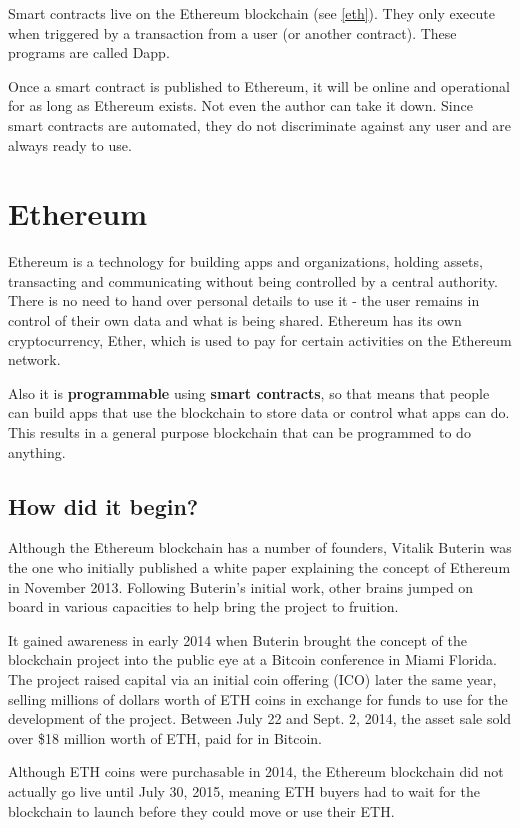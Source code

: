 \documentclass[MSE,Master,english]{twbook}%
\begin{document}
Smart contracts live on the Ethereum blockchain  (see \ref{eth}). They only execute when triggered by a transaction from a user (or another contract). These programs are called \ac{Dapp}.

Once a smart contract is published to Ethereum, it will be online and operational for as long as Ethereum exists. Not even the author can take it down. Since smart contracts are automated, they do not discriminate against any user and are always ready to use.\cite{ethereum}

\section{Ethereum\label{eth}}
Ethereum is a technology for building apps and organizations, holding assets, transacting and communicating without being controlled by a central authority. There is no need to hand over personal details to use it - the user remains in control of their own data and what is being shared. Ethereum has its own cryptocurrency, Ether, which is used to pay for certain activities on the Ethereum network.

Also it is \textbf{programmable} using \textbf{smart contracts}, so that means that people can build apps that use the blockchain to store data or control what apps can do. This results in a general purpose blockchain that can be programmed to do anything.\cite{ethereum}

\subsection{How did it begin?}
Although the Ethereum blockchain has a number of founders, Vitalik Buterin\cite{ethHistory} was the one who initially published a white paper explaining the concept of Ethereum in November 2013. Following Buterin's initial work, other brains jumped on board in various capacities to help bring the project to fruition.

It gained awareness in early 2014 when Buterin brought the concept of the blockchain project into the public eye at a Bitcoin conference in Miami Florida. The project raised capital via an initial coin offering (ICO) later the same year, selling millions of dollars worth of ETH coins in exchange for funds to use for the development of the project. Between July 22 and Sept. 2, 2014, the asset sale sold over \$18 million worth of ETH, paid for in Bitcoin.

Although ETH coins were purchasable in 2014, the Ethereum blockchain did not actually go live until July 30, 2015, meaning ETH buyers had to wait for the blockchain to launch before they could move or use their ETH. 
\end{document}
